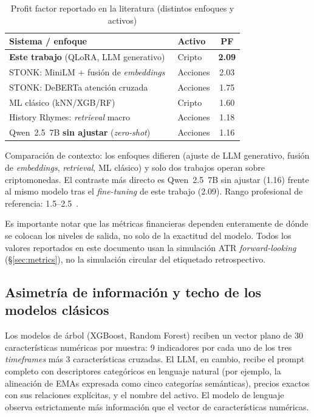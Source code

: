 \documentclass[10pt,twocolumn]{article}
\begin{document}
\begin{table}[H]
\centering
\caption{Profit factor reportado en la literatura (distintos enfoques y activos)}
\label{tab:pf_literatura}
\footnotesize
\begin{tabularx}{\columnwidth}{Xlc}
\toprule
\textbf{Sistema / enfoque} & \textbf{Activo} & \textbf{PF} \\
\midrule
\textbf{Este trabajo} (QLoRA, LLM generativo) & Cripto & \textbf{2.09} \\
STONK: MiniLM + fusi\'on de \textit{embeddings}~\cite{khanna2025stonk} & Acciones & 2.03 \\
STONK: DeBERTa atenci\'on cruzada~\cite{khanna2025stonk} & Acciones & 1.75 \\
ML cl\'asico (kNN/XGB/RF)~\cite{asgari2021} & Cripto & 1.60 \\
History Rhymes: \textit{retrieval} macro~\cite{khanna2025history} & Acciones & 1.18 \\
Qwen~2.5~7B \textbf{sin ajustar} (\textit{zero-shot})~\cite{khanna2025stonk} & Acciones & 1.16 \\
\bottomrule
\end{tabularx}
{\scriptsize Comparaci\'on de contexto: los enfoques difieren (ajuste de LLM generativo, fusi\'on de \textit{embeddings}, \textit{retrieval}, ML cl\'asico) y solo dos trabajos operan sobre criptomonedas. El contraste m\'as directo es Qwen~2.5~7B sin ajustar (1.16) frente al mismo modelo tras el \textit{fine-tuning} de este trabajo (2.09). Rango profesional de referencia: 1.5--2.5~\cite{pardo2008}.}
\end{table}

Es importante notar que las m\'etricas financieras dependen enteramente de d\'onde se colocan los niveles de salida, no solo de la exactitud del modelo. Todos los valores reportados en este documento usan la simulaci\'on ATR \textit{forward-looking} (\S\ref{sec:metrics}), no la simulaci\'on circular del etiquetado retrospectivo.

\subsection{Asimetr\'ia de informaci\'on y techo de los modelos cl\'asicos}
\label{sec:techo}

Los modelos de \'arbol (XGBoost, Random Forest) reciben un vector plano de 30 caracter\'isticas num\'ericas por muestra: 9 indicadores por cada uno de los tres \textit{timeframes} m\'as 3 caracter\'isticas cruzadas. El LLM, en cambio, recibe el prompt completo con descriptores categ\'oricos en lenguaje natural (por ejemplo, la alineaci\'on de EMAs expresada como cinco categor\'ias sem\'anticas), precios exactos con sus relaciones expl\'icitas, y el nombre del activo. El modelo de lenguaje observa estrictamente m\'as informaci\'on que el vector de caracter\'isticas num\'ericas.
\end{document}
